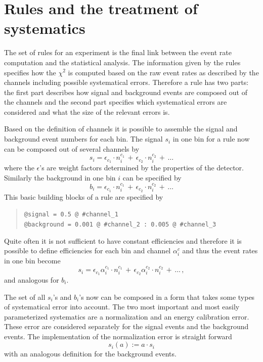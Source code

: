 \section{Rules and the treatment of systematics}
\label{sec:rules}

The set of rules for an experiment is the final 
link between the event rate
computation and the statistical analysis. The information given by the rules
specifies how the $\chi^2$ is computed based on the raw event rates as 
described by the channels including possible systematical errors. 
Therefore a rule has two parts: the first part describes how signal and 
background events are composed out of the channels and the second part
specifies which systematical errors are considered and what the size
of the relevant errors is.

Based on the definition of channels it is possible to assemble the 
signal and background event numbers for each bin.  
The signal $s_i$ in one bin for a rule now can be composed out of 
several channels by
\begin{equation}
s_i=\epsilon_{c_1}\cdot n_i^{c_1}\,+\,\epsilon_{c_2}\cdot n_i^{c_2}\,+\,\ldots
\end{equation}
where the $\epsilon$'s are weight factors determined by the properties
of the detector.
Similarly the background in one bin $i$ can be specified by
\begin{equation}
b_i=\epsilon_{c_1}\cdot n_i^{c_1}\,+\,\epsilon_{c_2}\cdot n_i^{c_2}\,+\,\ldots
\end{equation}
This basic building blocks of a rule are specified by
\begin{quote}
{\tt \tb @signal = 0.5 @ \#channel\_1\\
\tb @background = 0.001 @ \#channel\_2 :  0.005 @ \#channel\_3
}
\end{quote}

Quite often it is not sufficient to have constant efficiencies and therefore
it is possible to define efficiencies for each bin and channel $\alpha_i^c$
and thus the event rates in one bin become
\begin{equation}
s_i=\epsilon_{c_1}\alpha_i^{c_1}\cdot n_i^{c_1}\,+
\,\epsilon_{c_2}\alpha_i^{c_2}\cdot n_i^{c_2}\,+\,\ldots\,,
\end{equation}
and analogous for $b_i$.



The set of all $s_i$'s and $b_i$'s now can be composed in a form that takes
some types of systematical error into account. The two most important and
most easily parameterized systematics are a normalization and an energy
calibration error. These error are considered separately for the signal events
and the background events. The implementation of the normalization error
is straight forward
\begin{equation}
s_i(a):=a\cdot s_i
\end{equation} 
with an analogous definition for the background events.

